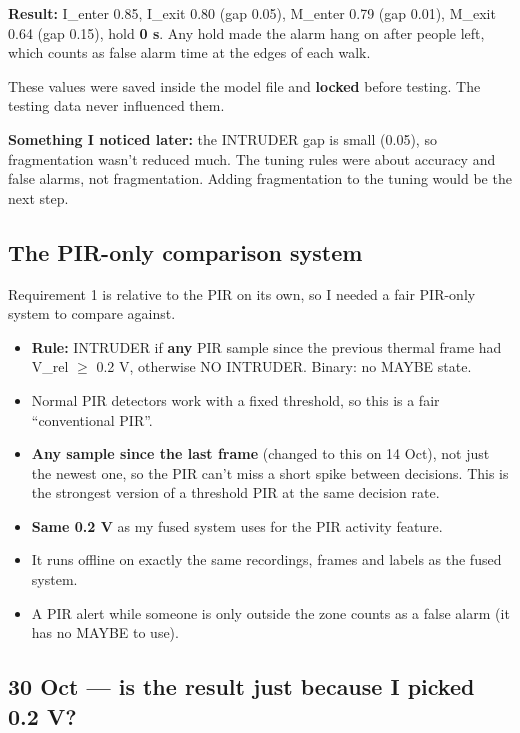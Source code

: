 \documentclass[11pt,a4paper]{article}
\providecommand{\tightlist}{\setlength{\itemsep}{0pt}\setlength{\parskip}{0pt}}
\begin{document}
\textbf{Result:} I\_enter
0.85, I\_exit 0.80 (gap 0.05),
M\_enter 0.79 (gap 0.01),
M\_exit 0.64 (gap 0.15), hold
\textbf{0 s}. Any hold made
the alarm hang on after people
left, which counts as false
alarm time at the edges of
each walk.

These values were saved inside
the model file and
\textbf{locked} before
testing. The testing data
never influenced them.

\textbf{Something I noticed
later:} the INTRUDER gap is
small (0.05), so fragmentation
wasn't reduced much. The
tuning rules were about
accuracy and false alarms, not
fragmentation. Adding
fragmentation to the tuning
would be the next step.

\hypertarget{the-pir-only-comparison-system}{%
\subsection{The PIR-only
comparison
system}\label{the-pir-only-comparison-system}}

Requirement 1 is relative to
the PIR on its own, so I
needed a fair PIR-only system
to compare against.

\begin{itemize}
\tightlist
\item
  \textbf{Rule:} INTRUDER if
  \textbf{any} PIR sample
  since the previous thermal
  frame had
  \textbar V\_rel\textbar{} $\geq$
  0.2 V, otherwise NO
  INTRUDER. Binary: no MAYBE
  state.
\item
  Normal PIR detectors work
  with a fixed threshold, so
  this is a fair
  ``conventional PIR''.
\item
  \textbf{Any sample since the
  last frame} (changed to this
  on 14 Oct), not just the
  newest one, so the PIR can't
  miss a short spike between
  decisions. This is the
  strongest version of a
  threshold PIR at the same
  decision rate.
\item
  \textbf{Same 0.2 V} as my
  fused system uses for the
  PIR activity feature.
\item
  It runs offline on exactly
  the same recordings, frames
  and labels as the fused
  system.
\item
  A PIR alert while someone is
  only outside the zone counts
  as a false alarm (it has no
  MAYBE to use).
\end{itemize}

\hypertarget{oct-is-the-result-just-because-i-picked-0.2-v}{%
\subsection{30 Oct --- is the
result just because I picked
0.2
V?}\label{oct-is-the-result-just-because-i-picked-0.2-v}}
\end{document}

